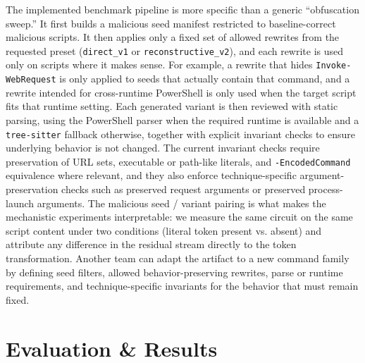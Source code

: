 \documentclass{article}
\begin{document}
The implemented benchmark pipeline is more specific than a generic ``obfuscation sweep.'' It first builds a malicious seed manifest restricted to baseline-correct malicious scripts. It then applies only a fixed set of allowed rewrites from the requested preset (\texttt{direct\_v1} or \texttt{reconstructive\_v2}), and each rewrite is used only on scripts where it makes sense. For example, a rewrite that hides \texttt{Invoke-WebRequest} is only applied to seeds that actually contain that command, and a rewrite intended for cross-runtime PowerShell is only used when the target script fits that runtime setting. Each generated variant is then reviewed with static parsing, using the PowerShell parser when the required runtime is available and a \texttt{tree-sitter} fallback otherwise, together with explicit invariant checks to ensure underlying behavior is not changed. The current invariant checks require preservation of URL sets, executable or path-like literals, and \texttt{-EncodedCommand} equivalence where relevant, and they also enforce technique-specific argument-preservation checks such as preserved request arguments or preserved process-launch arguments. The malicious seed / variant pairing is what makes the mechanistic experiments interpretable: we measure the same circuit on the same script content under two conditions (literal token present vs. absent) and attribute any difference in the residual stream directly to the token transformation. Another team can adapt the artifact to a new command family by defining seed filters, allowed behavior-preserving rewrites, parse or runtime requirements, and technique-specific invariants for the behavior that must remain fixed.

\section{Evaluation \& Results}
\end{document}
